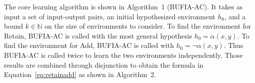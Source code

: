 \documentclass[pmlr]{jmlr}%
\begin{document}
	
	The core learning algorithm is shown in Algorithm~1 (BUFIA-AC).
	It takes as input a set of input-output pairs, an initial hypothesized environment \(h_0\), and a bound \(k\in\mathbb{N}\) on the size of environments to consider.
	To find the environment for \textsf{Retain},
	BUFIA-AC is called with the most general hypothesis \(h_0=\alpha(x,y)\).
	To find the environment for \textsf{Add},
	BUFIA-AC is called with  \(h_0=\neg\alpha(x,y)\).
	Thus BUFIA-AC is called twice to learn the two environments independently.
	Those results are combined through disjunction to obtain the formula in Equation~\ref{eq:retainadd} as shown in Algorithm~2.
	
	
\end{document}
